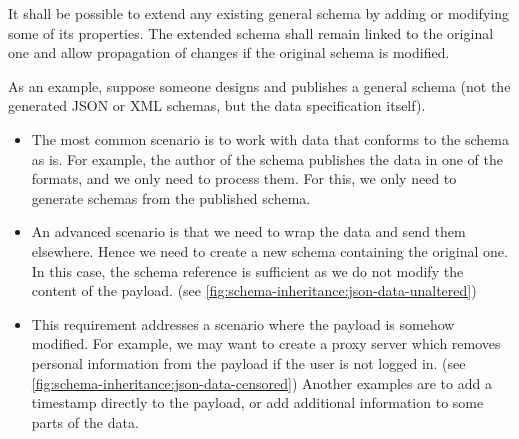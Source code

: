 \begin{requirement}
    It shall be possible to extend any existing general schema by adding or modifying some of its properties. The extended schema shall remain linked to the original one and allow propagation of changes if the original schema is modified.
    \label{requirement:schema-inheritance}
\end{requirement}

As an example, suppose someone designs and publishes a general schema (not the generated JSON or XML schemas, but the data specification itself).

\begin{itemize}
    \item The most common scenario is to work with data that conforms to the schema as is. For example, the author of the schema publishes the data in one of the formats, and we only need to process them. For this, we only need to generate schemas from the published schema.
    \item An advanced scenario is that we need to wrap the data and send them elsewhere. Hence we need to create a new schema containing the original one. In this case, the schema reference is sufficient as we do not modify the content of the payload. (see \autoref{fig:schema-inheritance:json-data-unaltered})
    \item This requirement addresses a scenario where the payload is somehow modified. For example, we may want to create a proxy server which removes personal information from the payload if the user is not logged in. (see \autoref{fig:schema-inheritance:json-data-censored}) Another examples are to add a timestamp directly to the payload, or add additional information to some parts of the data.
\end{itemize}


